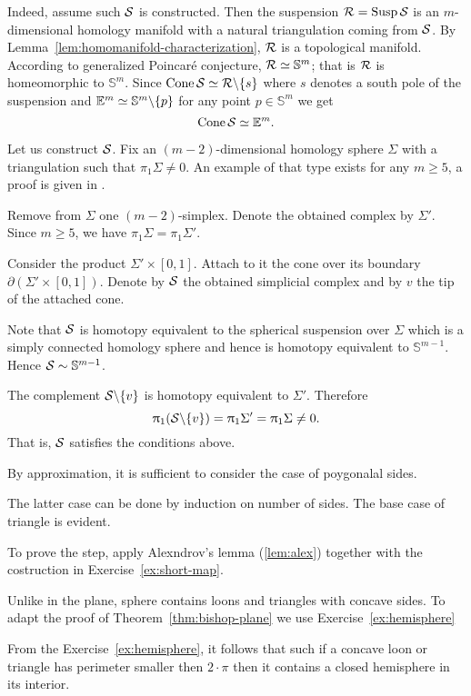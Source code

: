Indeed, assume such $\mathcal{S}$ is constructed.
Then the suspension
$\spc{R}\z=\Susp\spc{S}$
is an $m$-dimensional homology manifold with a natural triangulation coming from $\mathcal{S}$.
By Lemma~\ref{lem:homomanifold-characterization},
$\mathcal{R}$ is a topological manifold.
According to generalized Poincar\'{e} conjecture,
$\mathcal{R}\simeq\mathbb{S}^m$;
that is
$\mathcal{R}$ is homeomorphic to $\mathbb{S}^m$.
Since $\mathop{\rm Cone}\nolimits \mathcal{S}\simeq \mathcal{R}\backslash\{s\}$ where $s$ denotes a south pole of the suspension 
and $\mathbb{E}^m\simeq \mathbb{S}^m\backslash\{p\}$
for any point $p\in \mathbb{S}^m$
we get 
\[\mathop{\rm Cone}\nolimits \mathcal{S}\simeq\mathbb{E}^m.\]

Let us construct $\mathcal{S}$.
Fix an $(m-2)$-dimensional homology sphere $\Sigma$ with a triangulation such that $\pi_1\Sigma\ne0$.
An example of that type exists for any $m\ge 5$, a proof is given in \cite{kervaire}.

Remove from $\Sigma$ one $(m-2)$-simplex.
Denote the obtained complex by $\Sigma'$.
Since $m\ge 5$, we have $\pi_1\Sigma=\pi_1\Sigma'$.

Consider the product $\Sigma'\times [0,1]$. 
Attach to it the cone over its boundary $\partial (\Sigma'\times [0,1])$.
Denote by $\mathcal{S}$ the obtained simplicial complex
and by $v$ the tip of the attached cone.

Note that $\mathcal{S}$ is homotopy equivalent to the spherical suspension over $\Sigma$ which is a simply connected homology sphere and hence is homotopy equivalent to $\mathbb{S}^{m-1}$.
  Hence  $\mathcal{S}\sim\mathbb{S}^{m-1}$.

The complement $\mathcal{S}\backslash\{v\}$ is homotopy equivalent to $\Sigma'$.
Therefore 
\[
\uppi_1(\mathcal{S}\backslash\{v\})
=\uppi_1\Sigma'
=\uppi_1\Sigma\ne 0.
\]
That is, $\mathcal{S}$ satisfies the conditions above.
\qeds

By approximation,
it is sufficient to consider the case of poygonalal sides.

The latter case can be done by induction on number of sides.
The base case of triangle is evident.

To prove the step, apply Alexndrov's lemma (\ref{lem:alex}) 
together with the costruction in Exercise~\ref{ex:short-map}.
\qeds

Unlike in the plane, sphere contains loons and triangles with concave sides.
To adapt the proof of Theorem~\ref{thm:bishop-plane}
we use Exercise~\ref{ex:hemisphere}

From the Exercise~\ref{ex:hemisphere}, it follows that such if a concave loon or triangle has perimeter smaller then $2\cdot\pi$ then it contains a closed hemisphere in its interior.

